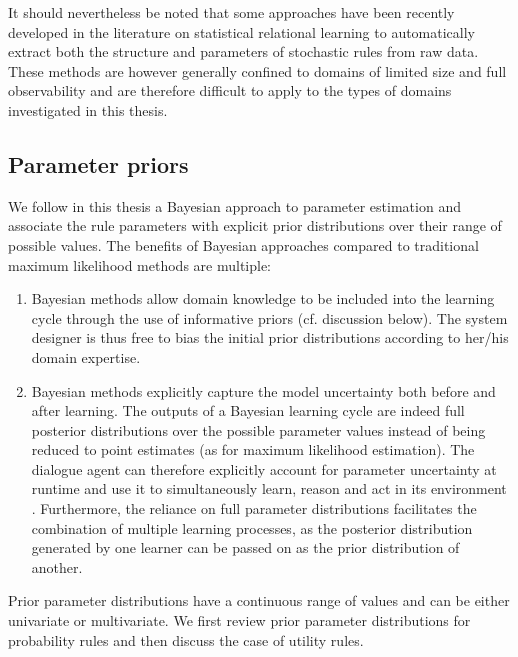 It should nevertheless be noted that some approaches have been recently developed in the literature on statistical relational learning \citep[see e.g. ][]{PasulaZK07,Kok:2009} to automatically extract both the structure and parameters of stochastic rules from raw data. These methods are however generally confined to domains of limited size and full observability and are therefore difficult to apply to the types of domains investigated in this thesis.  



\subsection{Parameter priors}
\label{sec:rule-params-priors}

We follow in this thesis a Bayesian approach to parameter estimation and associate the rule parameters with explicit prior distributions over their range of possible values.  The benefits of Bayesian approaches compared to traditional maximum likelihood methods are multiple:
\begin{enumerate} 
\item Bayesian methods allow domain knowledge to be included into the learning cycle through the use of informative priors (cf. discussion below). The system designer is thus free to bias the initial prior distributions according to her/his domain expertise.
\item Bayesian methods explicitly capture the model uncertainty both before and after learning.  The outputs of a Bayesian learning cycle are indeed full posterior distributions over the possible parameter values instead of being reduced to point estimates (as for maximum likelihood estimation).  The dialogue agent can therefore explicitly account for parameter uncertainty at runtime and use it to simultaneously learn, reason and act in its environment \citep{Ross:2011}. Furthermore, the reliance on full parameter distributions facilitates the combination of multiple learning processes, as the posterior distribution generated by one learner can be passed on as the prior distribution of another. 
\end{enumerate}

Prior parameter distributions have a continuous range of values and can be either univariate or multivariate.  We first review prior parameter distributions for probability rules and then discuss the case of utility rules.  


